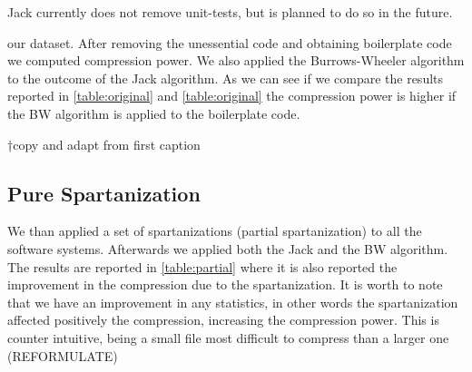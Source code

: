 Jack currently does not remove unit-tests, but is planned to do so in the
future.

our dataset. After removing the unessential code and obtaining boilerplate code
we computed compression power. We also applied the Burrows-Wheeler algorithm to
the outcome of the Jack algorithm. As we can see if we compare the results
reported in \cref{table:original} and \cref{table:original} the compression
power is higher if the BW algorithm is applied to the boilerplate code.

\begin{table}
  \matteo†{copy and adapt from first caption}
  \caption{The results of the compression using the Jack algorithm alone and
  both Jack and Burrows-Wheeler algorithms combined}
  \label{table:original}
  \par\vspace{10pt plus 6pt minus 4pt}
  \centering
\end{table}

\subsection{Pure Spartanization}

We than applied a set of spartanizations (partial spartanization) to all the
software systems. Afterwards we applied both the Jack and the BW algorithm.
The results are reported in \cref{table:partial} where it is also
reported the improvement in the compression due to the spartanization. It is
worth to note that we have an improvement in any statistics, in other words the
spartanization affected positively the compression, increasing the compression
power. This is counter intuitive, being a small file most difficult to
compress than a larger one (REFORMULATE)

